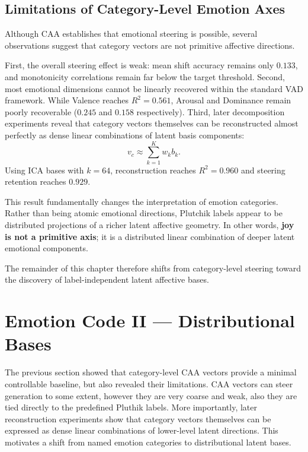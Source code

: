 \documentclass[12pt,twoside]{report}
\begin{document}
\subsection{Limitations of Category-Level Emotion Axes}
\label{sec:emotion_code:caa:limitations}

Although CAA establishes that emotional steering is possible, several observations suggest that category vectors are not primitive affective directions.

First, the overall steering effect is weak: mean shift accuracy remains only $0.133$, and monotonicity correlations remain far below the target threshold. 
Second, most emotional dimensions cannot be linearly recovered within the standard
VAD framework. While Valence reaches $R^2=0.561$, Arousal and Dominance remain poorly recoverable ($0.245$ and $0.158$ respectively).  
Third, later decomposition experiments reveal that category vectors themselves can be reconstructed almost perfectly as dense linear combinations of latent basis components:
\begin{equation}
v_c
\approx
\sum_{k=1}^{K}
w_k b_k.
\end{equation}
Using ICA bases with $k=64$, reconstruction reaches $R^2=0.960$ and steering retention reaches $0.929$.

This result fundamentally changes the interpretation of emotion categories. Rather than being atomic emotional directions, Plutchik labels appear to be distributed projections of a richer latent affective geometry. In other words, \textbf{joy is not a primitive axis}; it is a distributed linear combination of deeper latent emotional components. 

The remainder of this chapter therefore shifts from category-level steering toward the discovery of label-independent latent affective bases.

\section{Emotion Code II --- Distributional Bases}
\label{sec:emotion_code:basis}

The previous section showed that category-level CAA vectors provide a minimal controllable baseline, but also revealed their limitations.
CAA vectors can steer generation to some extent, however they are very coarse and weak, also they are tied directly to the predefined Pluthik labels.
More importantly, later reconstruction experiments show that category vectors themselves can be expressed as dense linear combinations of lower-level latent directions. This motivates a shift from named emotion categories to distributional latent bases.
\end{document}

